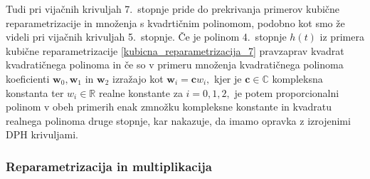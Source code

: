 \documentclass[12pt,a4paper,twoside]{article}
\theoremstyle{definition} %
\theoremstyle{plain} %
\numberwithin{equation}{section}  %
\newcommand{\R}{\mathbb R}
\renewcommand{\C}{\mathbb C}
\newcommand{\cV}{\mathbf{c}}
\newcommand{\wV}{\mathbf{w}}
\begin{document}
Tudi pri vijačnih krivuljah 7.\ stopnje pride do prekrivanja primerov kubične reparametrizacije in množenja s kvadrtičnim polinomom, podobno kot smo že videli pri vijačnih krivuljah 5.\ stopnje. Če je polinom 4.\ stopnje $h(t)$ iz primera kubične reparametrizacije \ref{kubicna_reparametrizacija_7} pravzaprav kvadrat kvadratičnega polinoma in če so v primeru množenja kvadratičnega polinoma koeficienti $\wV_0,\wV_1$ in $\wV_2$ izražajo kot $\wV_i=\cV w_i,$ kjer je $\cV\in\C$ kompleksna konstanta ter $w_i\in\R$ realne konstante za $i=0,1,2,$ je potem proporcionalni polinom v obeh primerih enak zmnožku kompleksne konstante in kvadratu realnega polinoma druge stopnje, kar nakazuje, da imamo opravka z izrojenimi DPH krivuljami.

\subsubsection{Reparametrizacija in multiplikacija}
\label{reparametrizacija_multiplikacija}
\end{document}
